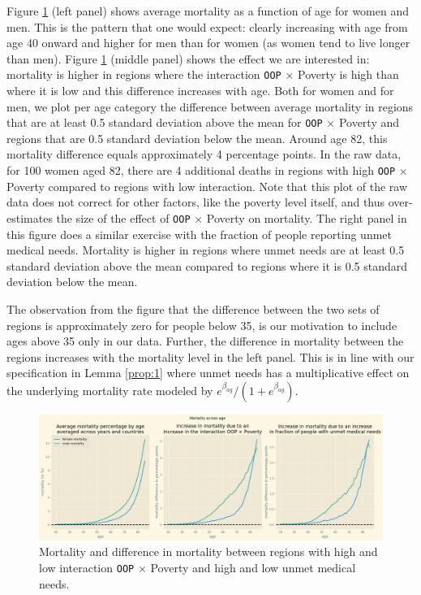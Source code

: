 \documentclass[a4paper,12pt]{article}
\begin{document}
Figure \ref{fig:DifferenceMortalityData} (left panel) shows average mortality as a function of age for women and men. This is the pattern that one would expect: clearly increasing with age from age 40 onward and higher for men than for women (as women tend to live longer than men). Figure \ref{fig:DifferenceMortalityData} (middle panel) shows the effect we are interested in: mortality is higher in regions where the interaction \texttt{OOP} \(\times\) Poverty is high than where it is low and this difference increases with age. Both for women and for men, we plot per age category the difference between average mortality in regions that are at least 0.5 standard deviation above the mean for \texttt{OOP} \(\times\) Poverty and regions that are 0.5 standard deviation below the mean. Around age 82, this mortality difference equals approximately 4 percentage points. In the raw data, for 100 women aged 82, there are 4 additional deaths in regions with high \texttt{OOP} \(\times\) Poverty compared to regions with low interaction. Note that this plot of the raw data does not correct for other factors, like the poverty level itself, and thus over-estimates the size of the effect of \texttt{OOP} \(\times\) Poverty on mortality. The right panel in this figure does a similar exercise with the fraction of people reporting unmet medical needs. Mortality is higher in regions where unmet needs are at least 0.5 standard deviation above the mean compared to regions where it is 0.5 standard deviation below the mean.

The observation from the figure that the difference between the two sets of regions is approximately zero for people below 35, is our motivation to include ages above 35 only in our data. Further, the difference in mortality between the regions increases with the mortality level in the left panel. This is in line with our specification in Lemma \ref{prop:1} where unmet needs has a multiplicative effect on the underlying mortality rate modeled by \(e^{\beta_{ag}}/(1+e^{\beta_{ag}})\).


\begin{figure}[htbp]
\centering
\includegraphics[width=.9\linewidth]{./figures/IncreaseMortalityInteractionData.png}
\caption{\label{fig:DifferenceMortalityData}Mortality and difference in mortality between regions with high and low interaction \texttt{OOP} \(\times\) Poverty and high and low unmet medical needs.}
\end{figure}
\end{document}
